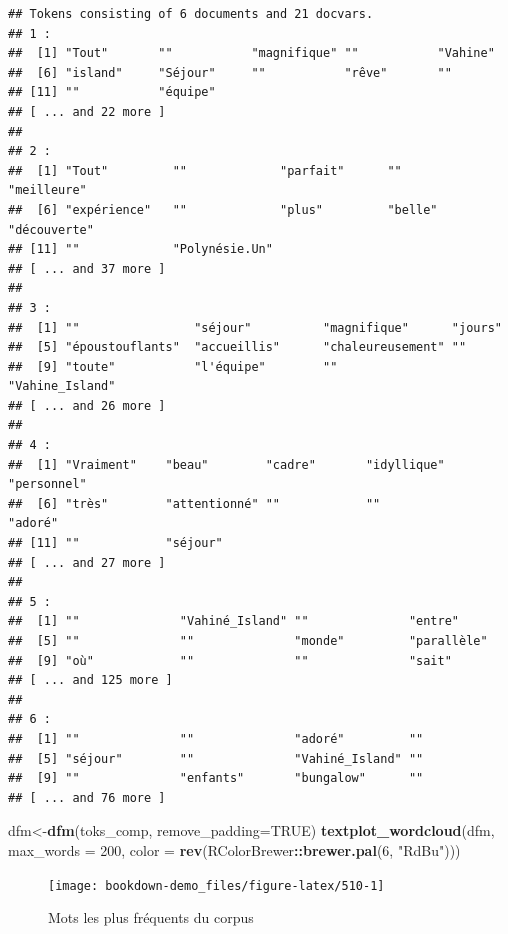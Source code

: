 \documentclass[
]{book}
\newenvironment{Shaded}{\begin{snugshade}}{\end{snugshade}}
\newcommand{\DataTypeTok}[1]{\textcolor[rgb]{0.13,0.29,0.53}{#1}}
\newcommand{\DecValTok}[1]{\textcolor[rgb]{0.00,0.00,0.81}{#1}}
\newcommand{\KeywordTok}[1]{\textcolor[rgb]{0.13,0.29,0.53}{\textbf{#1}}}
\newcommand{\NormalTok}[1]{#1}
\newcommand{\OperatorTok}[1]{\textcolor[rgb]{0.81,0.36,0.00}{\textbf{#1}}}
\newcommand{\OtherTok}[1]{\textcolor[rgb]{0.56,0.35,0.01}{#1}}
\newcommand{\StringTok}[1]{\textcolor[rgb]{0.31,0.60,0.02}{#1}}
\begin{document}
\begin{verbatim}
## Tokens consisting of 6 documents and 21 docvars.
## 1 :
##  [1] "Tout"       ""           "magnifique" ""           "Vahine"    
##  [6] "island"     "Séjour"     ""           "rêve"       ""          
## [11] ""           "équipe"    
## [ ... and 22 more ]
## 
## 2 :
##  [1] "Tout"         ""             "parfait"      ""             "meilleure"   
##  [6] "expérience"   ""             "plus"         "belle"        "découverte"  
## [11] ""             "Polynésie.Un"
## [ ... and 37 more ]
## 
## 3 :
##  [1] ""                "séjour"          "magnifique"      "jours"          
##  [5] "époustouflants"  "accueillis"      "chaleureusement" ""               
##  [9] "toute"           "l'équipe"        ""                "Vahine_Island"  
## [ ... and 26 more ]
## 
## 4 :
##  [1] "Vraiment"    "beau"        "cadre"       "idyllique"   "personnel"  
##  [6] "très"        "attentionné" ""            ""            "adoré"      
## [11] ""            "séjour"     
## [ ... and 27 more ]
## 
## 5 :
##  [1] ""              "Vahiné_Island" ""              "entre"        
##  [5] ""              ""              "monde"         "parallèle"    
##  [9] "où"            ""              ""              "sait"         
## [ ... and 125 more ]
## 
## 6 :
##  [1] ""              ""              "adoré"         ""             
##  [5] "séjour"        ""              "Vahiné_Island" ""             
##  [9] ""              "enfants"       "bungalow"      ""             
## [ ... and 76 more ]
\end{verbatim}

\begin{Shaded}
\begin{Highlighting}[]
\NormalTok{dfm<-}\KeywordTok{dfm}\NormalTok{(toks_comp, }\DataTypeTok{remove_padding=}\OtherTok{TRUE}\NormalTok{)}
\KeywordTok{textplot_wordcloud}\NormalTok{(dfm, }\DataTypeTok{max_words =} \DecValTok{200}\NormalTok{, }\DataTypeTok{color =} \KeywordTok{rev}\NormalTok{(RColorBrewer}\OperatorTok{::}\KeywordTok{brewer.pal}\NormalTok{(}\DecValTok{6}\NormalTok{, }\StringTok{"RdBu"}\NormalTok{)))}
\end{Highlighting}
\end{Shaded}

\begin{figure}

{\centering \texttt{[image: bookdown-demo\_files/figure-latex/510-1]} 

}

\caption{Mots les plus fréquents du corpus}\label{fig:510}
\end{figure}
\end{document}
